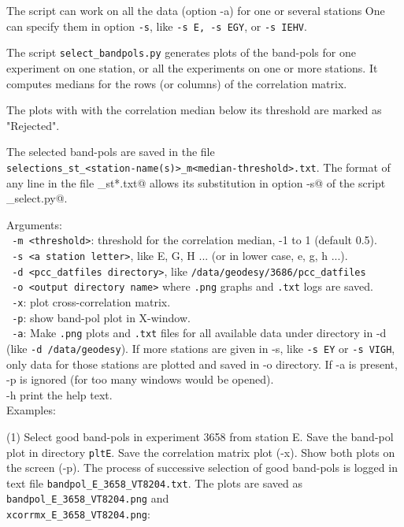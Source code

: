 \documentclass[preprint]{aastex}
\begin{document}
The script can work on all the data (option -a) for one or several stations One can specify them in option \texttt{-s}, like \texttt{-s E, -s EGY}, or \texttt{-s IEHV}.

The script \texttt{select\_bandpols.py} generates plots of the band-pols for one experiment on one station, or all the experiments on one or more stations. It computes medians for the rows (or columns) of the correlation matrix.

The plots with with the correlation median below its threshold are marked as "Rejected". 

The selected band-pols are saved in the file \\
\verb$selections_st_<station-name(s)>_m<median-threshold>.txt$. 
The format of any line in the file \verb@selections_st*.txt@ allows its substitution in option \verb@-s@ of the script \verb@pcc_select.py@.


Arguments: \\
\texttt{  -m <threshold>}:    threshold for the correlation median, -1 to 1 (default 0.5). \\
\texttt{ -s <a station letter>}, like E, G, H ... (or in lower case, e, g, h ...). \\
\texttt{  -d <pcc\_datfiles directory>}, like \texttt{/data/geodesy/3686/pcc\_datfiles} \\
\texttt{  -o <output directory name>} where \texttt{.png} graphs and \texttt{.txt} logs are saved. \\
\texttt{  -x}: plot cross-correlation matrix. \\
\texttt{  -p}: show band-pol plot in X-window. \\
\texttt{  -a}: Make \texttt{.png} plots and \texttt{.txt} files for all available data under directory in -d (like \texttt{-d /data/geodesy}). If more stations are given in -s, like \texttt{-s EY} or \texttt{-s VIGH}, only data for those stations are plotted and saved in -o directory. If -a is present, -p is ignored (for too many windows would be opened). \\
  -h print the help text. \\

Examples:

(1) Select good band-pols in experiment 3658 from station E. Save the band-pol
plot in directory \texttt{pltE}. Save the correlation matrix plot (-x). Show both plots
on the screen (-p). 
The process of successive selection of good band-pols is logged in text file 
\verb$bandpol_E_3658_VT8204.txt$. 
The plots are saved as \verb$bandpol_E_3658_VT8204.png$ and \\
\verb$xcorrmx_E_3658_VT8204.png$: 
\end{document}
